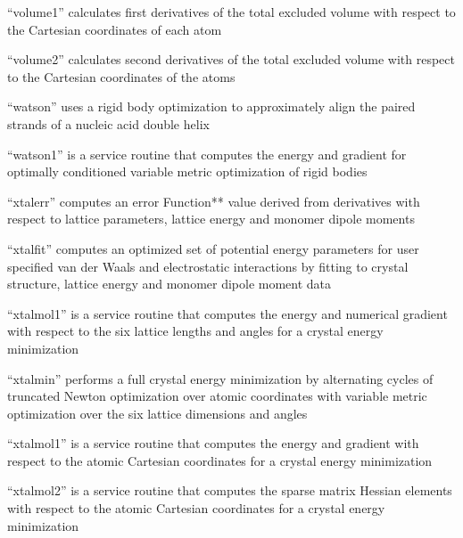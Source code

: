\documentclass[letterpaper,11pt,english]{sphinxmanual}
\begin{document}

“volume1” calculates first derivatives of the total excluded volume with respect to the Cartesian coordinates of each atom


“volume2” calculates second derivatives of the total excluded volume with respect to the Cartesian coordinates of the atoms


“watson” uses a rigid body optimization to approximately align the paired strands of a nucleic acid double helix


“watson1” is a service routine that computes the energy and gradient for optimally conditioned variable metric optimization of rigid bodies


“xtalerr” computes an error Function** value derived from derivatives with respect to lattice parameters, lattice energy and monomer dipole moments


“xtalfit” computes an optimized set of potential energy parameters for user specified van der Waals and electrostatic interactions by fitting to crystal structure, lattice energy and monomer dipole moment data


“xtalmol1” is a service routine that computes the energy and numerical gradient with respect to the six lattice lengths and angles for a crystal energy minimization


“xtalmin” performs a full crystal energy minimization by alternating cycles of truncated Newton optimization over atomic coordinates with variable metric optimization over the six lattice dimensions and angles


“xtalmol1” is a service routine that computes the energy and gradient with respect to the atomic Cartesian coordinates for a crystal energy minimization


“xtalmol2” is a service routine that computes the sparse matrix Hessian elements with respect to the atomic Cartesian coordinates for a crystal energy minimization
\end{document}
